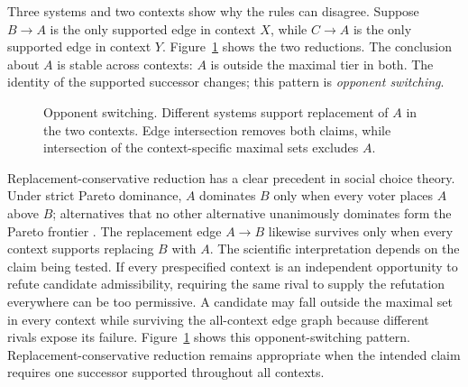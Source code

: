 \documentclass[11pt]{article}
\theoremstyle{remark}
\begin{document}
Three systems and two contexts show why the rules can disagree. Suppose
$B\to A$ is the only supported edge in context $X$, while $C\to A$ is the only
supported edge in context $Y$. Figure~\ref{fig:round-robin-opponent-switching}
shows the two reductions. The conclusion about $A$ is stable across contexts:
$A$ is outside the maximal tier in both. The identity of the supported
successor changes; this pattern is \emph{opponent switching}.

\begin{figure}[htbp]
\centering
{}
\caption{Opponent switching. Different systems support replacement of $A$ in
the two contexts. Edge intersection removes both claims, while intersection
of the context-specific maximal sets excludes $A$.}
\label{fig:round-robin-opponent-switching}
\end{figure}

Replacement-conservative reduction has a clear precedent in social choice
theory. Under strict Pareto dominance, $A$ dominates $B$ only when every voter
places $A$ above $B$; alternatives that no other alternative unanimously
dominates form the Pareto frontier \cite{sen1970collective}. The replacement
edge $A\to B$ likewise survives only when every context supports replacing
$B$ with $A$. The scientific interpretation depends on the claim being
tested. If every prespecified context is an independent opportunity to refute
candidate admissibility, requiring the same rival to supply the refutation
everywhere can be too permissive. A candidate may fall outside the maximal set
in every context while surviving the all-context edge graph because different
rivals expose its failure. Figure~\ref{fig:round-robin-opponent-switching}
shows this opponent-switching pattern. Replacement-conservative reduction
remains appropriate when the intended claim requires one successor supported
throughout all contexts.
\end{document}
